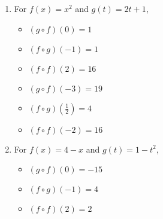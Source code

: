 \begin{enumerate}

\item  For  $f(x) = x^2$ and $g(t) = 2t+1$,
\begin{multicols}{3}

\begin{itemize}

\item  $(g\circ f)(0) = 1$

\item  $(f\circ g)(-1) = 1$

\item  $(f \circ f)(2) = 16$

\end{itemize}

\end{multicols}

\begin{multicols}{3}

\begin{itemize}

\item  $(g\circ f)(-3) = 19$

\item  $(f\circ g)\left(\frac{1}{2}\right) = 4$

\item  $(f \circ f)(-2) = 16$

\end{itemize}

\end{multicols}

\item  For   $f(x) = 4-x$ and $g(t) = 1-t^2$,
\begin{multicols}{3}

\begin{itemize}

\item  $(g\circ f)(0) = -15$

\item  $(f\circ g)(-1) = 4$

\item  $(f \circ f)(2) = 2$

\end{itemize}

\end{multicols}

\begin{multicols}{3}

\begin{itemize}


\end{itemize}
\end{multicols}
\end{enumerate}
